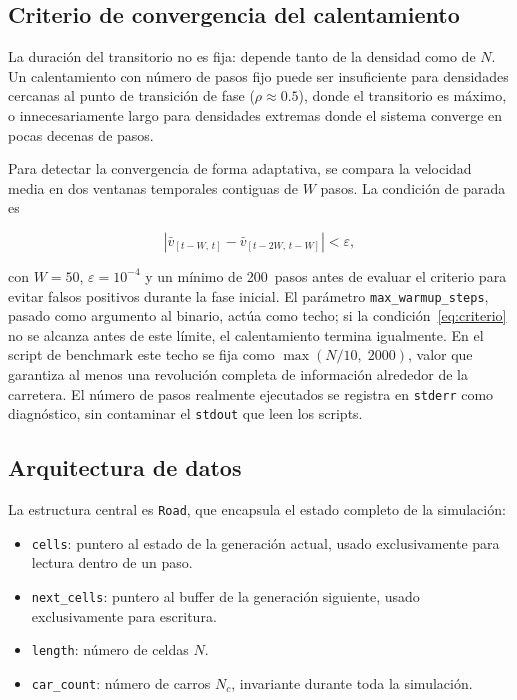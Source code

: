 \subsection{Criterio de convergencia del calentamiento}

La duración del transitorio no es fija: depende tanto de la densidad como
de $N$. Un calentamiento con número de pasos fijo puede ser insuficiente
para densidades cercanas al punto de transición de fase ($\rho \approx
0.5$), donde el transitorio es máximo, o innecesariamente largo para
densidades extremas donde el sistema converge en pocas decenas de pasos.

Para detectar la convergencia de forma adaptativa, se compara la velocidad
media en dos ventanas temporales contiguas de $W$ pasos. La condición de
parada es

\begin{equation}
    \left|
        \bar{v}_{[t-W,\, t]}
        - \bar{v}_{[t-2W,\, t-W]}
    \right| < \varepsilon,
    \label{eq:criterio}
\end{equation}

con $W = 50$, $\varepsilon = 10^{-4}$ y un mínimo de 200~pasos antes de
evaluar el criterio para evitar falsos positivos durante la fase inicial.
El parámetro \texttt{max\_warmup\_steps}, pasado como argumento al
binario, actúa como techo; si la condición~\eqref{eq:criterio} no se
alcanza antes de este límite, el calentamiento termina igualmente. En el
script de benchmark este techo se fija como $\max(N / 10,\; 2000)$, valor
que garantiza al menos una revolución completa de información alrededor de
la carretera. El número de pasos realmente ejecutados se registra en
\texttt{stderr} como diagnóstico, sin contaminar el \texttt{stdout} que
leen los scripts.

\subsection{Arquitectura de datos}

La estructura central es \texttt{Road}, que encapsula el estado completo
de la simulación:

\begin{itemize}
    \item \texttt{cells}: puntero al estado de la generación actual, usado
          exclusivamente para lectura dentro de un paso.
    \item \texttt{next\_cells}: puntero al buffer de la generación
          siguiente, usado exclusivamente para escritura.
    \item \texttt{length}: número de celdas $N$.
    \item \texttt{car\_count}: número de carros $N_c$, invariante durante
          toda la simulación.
\end{itemize}

